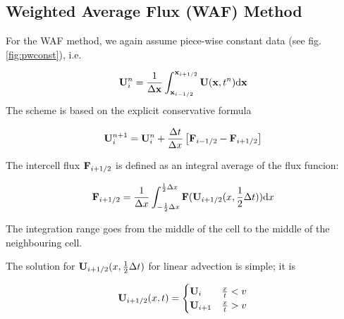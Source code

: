 \subsection{Weighted Average Flux (WAF) Method}



For the WAF method, we again assume piece-wise constant data (see fig. \ref{fig:pwconst}), i.e.

\begin{equation}
	\mathbf{U}_i ^ n = \frac{1}{\Delta \mathbf{x}} \int_{\mathbf{x}_{i-1/2}}^{\mathbf{x}_{i+1/2}} \mathbf{U}(\mathbf{x}, t^n) \mathrm{d} \mathbf{x}
\end{equation}
The scheme is based on the explicit conservative formula

\begin{equation}
	\mathbf{U}_{i}^{n+1} = \mathbf{U}_i^n + \frac{\Delta t}{\Delta x} \left[ \mathbf{F}_{i - 1/2} - \mathbf{F}_{i + 1/2} \right]
\end{equation}



The intercell flux $\mathbf{F}_{i + 1/2}$ is defined as an integral average of the flux funcion:

\begin{equation}
	\mathbf{F}_{i + 1/2} = \frac{1}{\Delta x} \int_{-\frac{1}{2} \Delta x} ^{\frac{1}{2} \Delta x} \mathbf{F} (\mathbf{U}_{i+1/2} ( x, \frac{1}{2}\Delta t)) \mathrm{d} x \label{eq:waf-flux}
\end{equation}

The integration range goes from the middle of the cell to the middle of the neighbouring cell.

The solution for $\mathbf{U}_{i+1/2} ( x, \frac{1}{2}\Delta t)$ for linear advection is simple; it is

\begin{align}
	\mathbf{U}_{i+1/2} ( x, t) = 
		\begin{cases}
			\mathbf{U}_i 		& \frac{x}{t} < v \\
			\mathbf{U}_{i+1} 	& \frac{x}{t} > v \\
		\end{cases}
\end{align}



